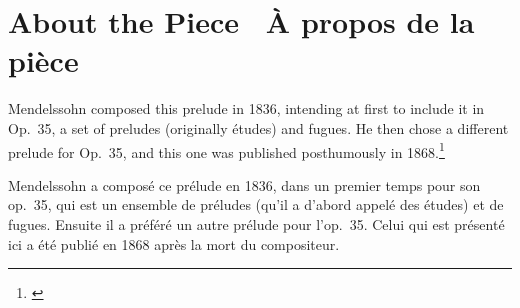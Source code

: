 \documentclass[a4paper, 12pt]{book}
\newcommand{\bigdot}[0]{{\Large \textbullet}}
\newcommand{\centerbigdot}[0]{\begin{center}\bigdot\end{center}}
\begin{document}
\section*{About the Piece \bigdot\ À propos de la pièce}

Mendelssohn composed this prelude in 1836, intending at first to
include it in Op.\ 35, a set of preludes (originally études) and
fugues. He then chose a different prelude for Op.\ 35, and this one
was published posthumously in 1868.\footnote{\cite[188--198]{todd_2008}\label{todd}}

\centerbigdot

Mendelssohn a composé ce prélude en 1836, dans un premier temps pour
son op.\ 35, qui est un ensemble de préludes (qu'il a d'abord appelé
des études) et de fugues. Ensuite il a préféré un autre prélude pour
l'op.\ 35. Celui qui est présenté ici a été publié en 1868 après la
mort du compositeur.
\end{document}
